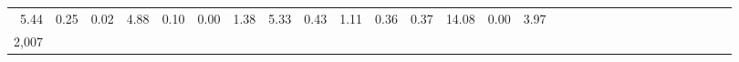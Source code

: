 \documentclass[]{article}
\begin{document}
\begin{longtable}[]{@{}rlrrrrrrrrrrrrrrrrrrrrrrrrrrr@{}}
\begin{minipage}[t]{0.02\columnwidth}
5.44\strut
\end{minipage} & \begin{minipage}[t]{0.01\columnwidth}\raggedleft\strut
0.25\strut
\end{minipage} & \begin{minipage}[t]{0.01\columnwidth}\raggedleft\strut
0.02\strut
\end{minipage} & \begin{minipage}[t]{0.01\columnwidth}\raggedleft\strut
4.88\strut
\end{minipage} & \begin{minipage}[t]{0.01\columnwidth}\raggedleft\strut
0.10\strut
\end{minipage} & \begin{minipage}[t]{0.02\columnwidth}\raggedleft\strut
0.00\strut
\end{minipage} & \begin{minipage}[t]{0.02\columnwidth}\raggedleft\strut
1.38\strut
\end{minipage} & \begin{minipage}[t]{0.01\columnwidth}\raggedleft\strut
5.33\strut
\end{minipage} & \begin{minipage}[t]{0.01\columnwidth}\raggedleft\strut
0.43\strut
\end{minipage} & \begin{minipage}[t]{0.01\columnwidth}\raggedleft\strut
1.11\strut
\end{minipage} & \begin{minipage}[t]{0.02\columnwidth}\raggedleft\strut
0.36\strut
\end{minipage} & \begin{minipage}[t]{0.01\columnwidth}\raggedleft\strut
0.37\strut
\end{minipage} & \begin{minipage}[t]{0.01\columnwidth}\raggedleft\strut
14.08\strut
\end{minipage} & \begin{minipage}[t]{0.01\columnwidth}\raggedleft\strut
0.00\strut
\end{minipage} & \begin{minipage}[t]{0.01\columnwidth}\raggedleft\strut
3.97\strut
\end{minipage}\tabularnewline
\begin{minipage}[t]{0.01\columnwidth}\raggedleft\strut
2,007\strut
\end{minipage} & \begin{minipage}[t]{0.02\columnwidth}\raggedright\strut

\end{minipage}
\end{longtable}
\end{document}
